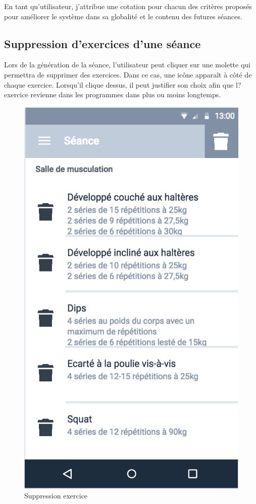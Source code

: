 \begin{itshape}
En tant qu'utilisateur, j'attribue une cotation pour chacun des critères proposés pour améliorer le système dans sa globalité et le contenu des futures séances.
\end{itshape}

\subsection{Suppression d'exercices d'une séance}

Lors de la génération de la séance, l'utilisateur peut cliquer sur une molette qui permettra de supprimer des exercices. Dans ce cas, une icône apparaît à côté de chaque exercice. Lorsqu'il clique dessus, il peut justifier son choix afin que l?exercice revienne dans les programmes dans plus ou moins longtemps.

\begin{figure}[!h]
\centering
\includegraphics[scale=0.3]{ihms/remove_exo}
\caption{Suppression exercice}
\end{figure}

